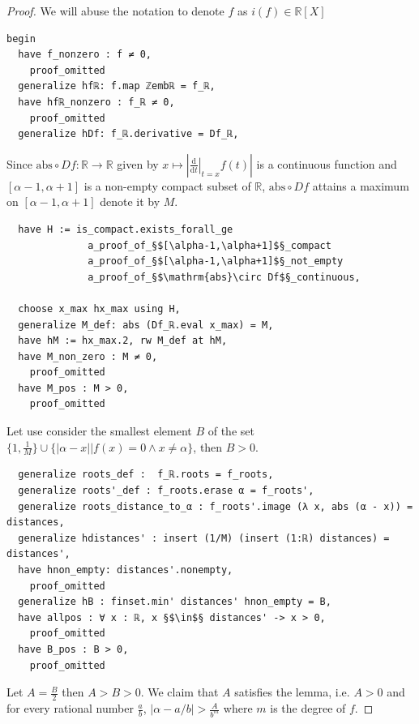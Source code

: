 \documentclass{report}
\theoremstyle{definition}
\begin{document}
\begin{proof}
We will abuse the notation to denote $f$ as $i(f)\in\mathbb{R}[X]$
\begin{verbatim}
begin
  have f_nonzero : f ≠ 0,
    proof_omitted
  generalize hfℝ: f.map ℤembℝ = f_ℝ,
  have hfℝ_nonzero : f_ℝ ≠ 0,
    proof_omitted
  generalize hDf: f_ℝ.derivative = Df_ℝ,
\end{verbatim}

Since $\mathrm{abs}\circ Df : \mathbb R\to\mathbb R$ given by $x\mapsto \left|\left.\frac{\mathrm d}{\mathrm d t}\right|_{t=x}f(t)\right|$ is a continuous function and $[\alpha-1,\alpha+1]$ is a non-empty compact subset of $\mathbb R$, $\mathrm{abs} \circ Df$ attains a maximum on $[\alpha-1,\alpha+1]$ denote it by $M$.

\begin{verbatim}
  have H := is_compact.exists_forall_ge 
              a_proof_of_§$[\alpha-1,\alpha+1]$§_compact
              a_proof_of_§$[\alpha-1,\alpha+1]$§_not_empty
              a_proof_of_§$\mathrm{abs}\circ Df$§_continuous,

  choose x_max hx_max using H,
  generalize M_def: abs (Df_ℝ.eval x_max) = M,
  have hM := hx_max.2, rw M_def at hM,
  have M_non_zero : M ≠ 0,
    proof_omitted
  have M_pos : M > 0,
    proof_omitted
\end{verbatim}

Let use consider the smallest element $B$ of the set $\{1, \frac 1 M\}\cup\{\left|\alpha-x\right|| f(x)=0 \land x\ne\alpha\}$, then $B>0$.
\begin{verbatim}
  generalize roots_def :  f_ℝ.roots = f_roots,
  generalize roots'_def : f_roots.erase α = f_roots',
  generalize roots_distance_to_α : f_roots'.image (λ x, abs (α - x)) = distances,
  generalize hdistances' : insert (1/M) (insert (1:ℝ) distances) = distances',
  have hnon_empty: distances'.nonempty, 
    proof_omitted
  generalize hB : finset.min' distances' hnon_empty = B,
  have allpos : ∀ x : ℝ, x §$\in$§ distances' -> x > 0,
    proof_omitted
  have B_pos : B > 0,
    proof_omitted
\end{verbatim}

Let $A=\frac B 2$ then $A > B > 0$. We claim that $A$ satisfies the lemma, i.e. $A>0$ and for every rational number $\frac ab$, $\left|\alpha-a/b\right|>\frac A{b^m}$ where $m$ is the degree of $f$.


\end{proof}
\end{document}
